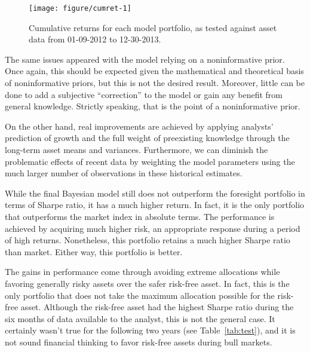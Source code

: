 \documentclass[a4paper]{article}\usepackage[]{graphicx}\usepackage[]{color}
\newenvironment{knitrout}{}{} %
\begin{document}
\begin{knitrout}
\color{fgcolor}\begin{figure}[t]
\texttt{[image: figure/cumret-1]} \caption[Cumulative returns for each model portfolio, as tested against asset data from 01-09-2012 to 12-30-2013]{Cumulative returns for each model portfolio, as tested against asset data from 01-09-2012 to 12-30-2013.\label{fig:cumret}}
\end{figure}


\end{knitrout}

The same issues appeared with the model relying on a noninformative prior. Once again, this should be expected given the mathematical and theoretical basis of noninformative priors, but this is not the desired result. Moreover, little can be done to add a subjective ``correction'' to the model or gain any benefit from general knowledge. Strictly speaking, that is the point of a noninformative prior. 

On the other hand, real improvements are achieved by applying analysts' prediction of growth and the full weight of preexisting knowledge through the long-term asset means and variances. Furthermore, we can diminish the problematic effects of recent data by weighting the model parameters using the much larger number of observations in these historical estimates.

While the final Bayesian model still does not outperform the foresight portfolio in terms of Sharpe ratio, it has a much higher return. In fact, it is the only portfolio that outperforms the market index in absolute terms. The performance is achieved by acquiring much higher risk, an appropriate response during a period of high returns. Nonetheless, this portfolio retains a much higher Sharpe ratio than market. Either way, this portfolio is better.

The gains in performance come through avoiding extreme allocations while favoring generally risky assets over the safer risk-free asset. In fact, this is the only portfolio that does not take the maximum allocation possible for the risk-free asset. Although the risk-free asset had the highest Sharpe ratio during the six months of data available to the analyst, this is not the general case. It certainly wasn't true for the following two years (see Table~\ref{tab:test}), and it is not sound financial thinking to favor risk-free assets during bull markets.
\end{document}
